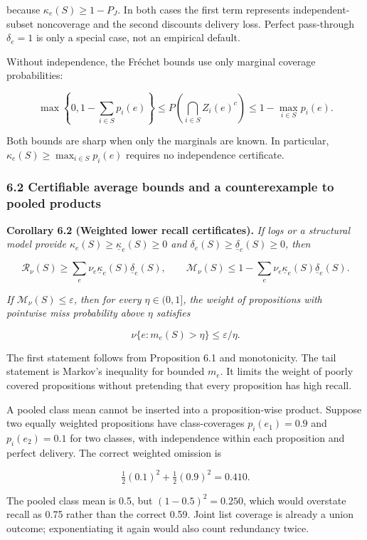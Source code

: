 \documentclass[
  11pt]{article}
\begin{document}
because \(\kappa_e(S)\ge1-P_J\). In both cases the first term represents
independent-subset noncoverage and the second discounts delivery loss.
Perfect pass-through \(\delta_e=1\) is only a special case, not an
empirical default.

Without independence, the Fréchet bounds use only marginal coverage
probabilities:

\[\max\left\{0,1-\sum_{i\in S}p_i(e)\right\}\le P\!\left(\bigcap_{i\in S}Z_i(e)^c\right)\le1-\max_{i\in S}p_i(e).\]

Both bounds are sharp when only the marginals are known. In particular,
\(\kappa_e(S)\ge\max_{i\in S}p_i(e)\) requires no independence
certificate.

\subsubsection{6.2 Certifiable average bounds and a counterexample to
pooled
products}\label{certifiable-average-bounds-and-a-counterexample-to-pooled-products}

\textbf{Corollary 6.2 (Weighted lower recall certificates).} \emph{If
logs or a structural model provide
\(\kappa_e(S)\ge\underline\kappa_e(S)\ge0\) and
\(\delta_e(S)\ge\underline\delta_e(S)\ge0\), then}

\[\mathcal R_\nu(S)\ge\sum_e\nu_e\underline\kappa_e(S)\underline\delta_e(S),\qquad
\mathcal M_\nu(S)\le1-\sum_e\nu_e\underline\kappa_e(S)\underline\delta_e(S).\]

\emph{If \(\mathcal M_\nu(S)\le\varepsilon\), then for every
\(\eta\in(0,1]\), the weight of propositions with pointwise miss
probability above \(\eta\) satisfies}

\[\nu\{e:m_e(S)>\eta\}\le\varepsilon/\eta.\]

The first statement follows from Proposition 6.1 and monotonicity. The
tail statement is Markov's inequality for bounded \(m_e\). It limits the
weight of poorly covered propositions without pretending that every
proposition has high recall.

A pooled class mean cannot be inserted into a proposition-wise product.
Suppose two equally weighted propositions have class-coverages
\(p_i(e_1)=0.9\) and \(p_i(e_2)=0.1\) for two classes, with independence
within each proposition and perfect delivery. The correct weighted
omission is

\[\tfrac12(0.1)^2+\tfrac12(0.9)^2=0.410.\]

The pooled class mean is 0.5, but \((1-0.5)^2=0.250\), which would
overstate recall as 0.75 rather than the correct 0.59. Joint list
coverage is already a union outcome; exponentiating it again would also
count redundancy twice.
\end{document}
